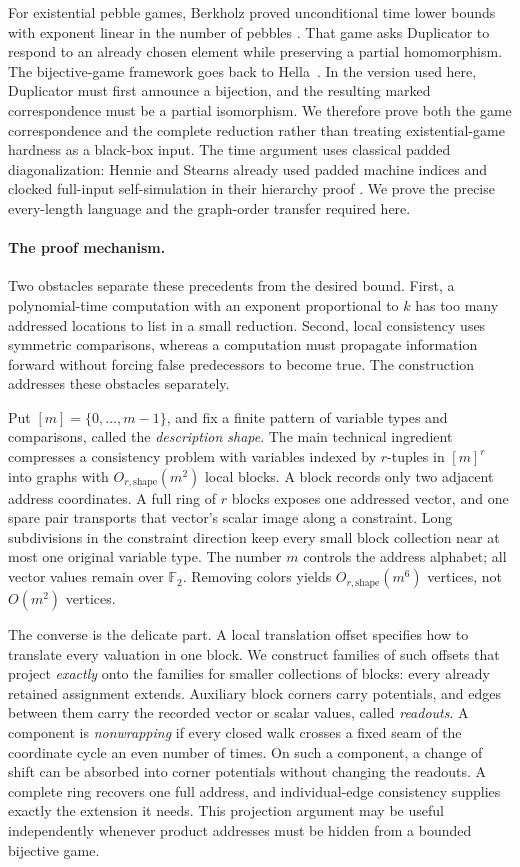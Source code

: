 \documentclass[11pt]{article}
\newcommand{\F}{\mathbb{F}}
\theoremstyle{definition}
\theoremstyle{remark}
\numberwithin{equation}{section}
\begin{document}
For existential pebble games, Berkholz proved unconditional time lower
bounds with exponent linear in the number of pebbles
\cite[Theorem~1]{ExistentialPebbles}. That game asks Duplicator to
respond to an already chosen element while preserving a partial
homomorphism. The bijective-game framework goes back to
Hella~\cite{Hella1996}. In the version used here, Duplicator must first
announce a bijection, and the resulting marked correspondence must be
a partial isomorphism. We therefore prove both the game correspondence
and the complete reduction rather than treating existential-game
hardness as a black-box input. The time argument uses classical padded
diagonalization: Hennie and Stearns already used padded machine indices
and clocked full-input self-simulation in their hierarchy proof
\cite[Section~6, Theorem~7]{HennieStearns1966}. We prove the precise
every-length language and the graph-order transfer required here.

\paragraph{The proof mechanism.}
Two obstacles separate these precedents from the desired bound. First,
a polynomial-time computation with an exponent proportional to $k$
has too many addressed locations to list in a small reduction. Second,
local consistency uses symmetric comparisons, whereas a computation
must propagate information forward without forcing false predecessors
to become true. The construction addresses these obstacles separately.

Put $[m]=\{0,\ldots,m-1\}$, and fix a finite pattern of variable types
and comparisons, called the \emph{description shape}.
The main technical ingredient compresses a consistency problem with
variables indexed by $r$-tuples in $[m]^r$ into graphs with
$O_{r,\mathrm{shape}}(m^2)$ local blocks. A block records only two adjacent address
coordinates. A full ring of $r$ blocks exposes one addressed vector,
and one spare pair transports that vector's scalar image along a
constraint. Long subdivisions in the constraint direction keep every
small block collection near at most one original variable type.
The number $m$ controls the address alphabet; all vector values remain
over $\F_2$. Removing colors yields $O_{r,\mathrm{shape}}(m^6)$ vertices,
not $O(m^2)$ vertices.

The converse is the delicate part. A local translation offset specifies
how to translate every valuation in one block. We construct families of
such offsets that project \emph{exactly} onto the families for smaller
collections of blocks: every already retained assignment extends.
Auxiliary block corners carry potentials, and edges between them carry
the recorded vector or scalar values, called \emph{readouts}. A component
is \emph{nonwrapping} if every closed walk crosses a fixed seam of the
coordinate cycle an even number of times. On such a component, a change
of shift can be absorbed into corner potentials without changing the
readouts. A complete ring recovers one full address, and
individual-edge consistency supplies exactly the extension it needs.
This projection argument may be useful independently whenever
product addresses must be hidden from a bounded bijective game.
\end{document}
